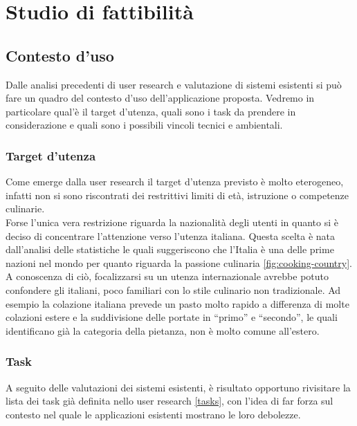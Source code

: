 \section{Studio di fattibilità}

\subsection{Contesto d'uso}
Dalle analisi precedenti di user research e valutazione di sistemi
esistenti si può fare un quadro del contesto d'uso dell'applicazione
proposta.
Vedremo in particolare qual'è il target d'utenza, quali sono i task da
prendere in considerazione e quali sono i possibili vincoli tecnici e
ambientali.  

\subsubsection{Target d'utenza}
Come emerge dalla user research il target d'utenza previsto è molto
eterogeneo, infatti non si sono riscontrati dei restrittivi limiti di
età, istruzione o competenze culinarie.\\
Forse l'unica vera restrizione riguarda la nazionalità degli utenti
in quanto si è deciso di concentrare
l'attenzione verso l'utenza italiana. Questa scelta è nata dall'analisi
delle statistiche le quali suggeriscono che l'Italia è una delle
prime nazioni nel mondo per quanto riguarda la passione culinaria
\ref{fig:cooking-country}. A conoscenza di ciò, focalizzarsi su un
utenza internazionale avrebbe potuto confondere gli italiani, poco familiari
con lo stile culinario non tradizionale. Ad esempio la colazione
italiana prevede un pasto molto rapido a differenza di molte colazioni
estere e la suddivisione delle portate in ``primo'' e ``secondo'', le quali
identificano già la categoria della pietanza, non è molto comune
all'estero.

\subsubsection{Task}
A seguito delle valutazioni dei sistemi esistenti, è risultato opportuno
rivisitare la lista dei task già definita nello user research
\ref{tasks}, con
l'idea di far forza sul contesto nel quale le applicazioni esistenti
mostrano le loro debolezze.

